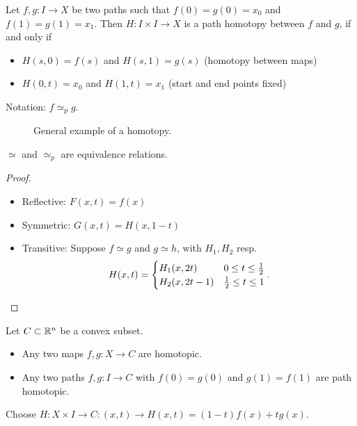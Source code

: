 \begin{definition}
    Let $f, g: I \to  X$ be two paths such that $f(0) = g(0) = x_0$ and $f(1) = g(1) = x_1$. Then $H: I \times  I \to  X$ is a path homotopy between $f$ and $g$, if and only if
    \begin{itemize}
        \item $H(s,0) = f(s)$ and  $H(s, 1) = g(s)$ (homotopy between maps)
        \item  $H(0, t) = x_0$ and $H(1, t) = x_1$ (start and end points fixed)
    \end{itemize}
    Notation: $f \simeq_p g$.
\end{definition}


\begin{figure}[ht]
    \centering
    \caption{General example of a homotopy.}
    \label{fig:homotopy-general-example}
\end{figure}


\begin{lemma}
    $\simeq$ and  $\simeq_p$ are equivalence relations.
\end{lemma}
\begin{proof}
    \leavevmode
    \begin{itemize}
        \item Reflective: $F(x, t) = f(x)$
        \item Symmetric: $G(x, t) = H(x, 1-t)$ 
        \item Transitive:  Suppose $f \simeq g$ and  $g \simeq h$, with  $H_1, H_2$ resp.
            \[
                H(x, t) = \begin{cases}
                    H_1(x, 2t) & 0 \le t \le  \frac{1}{2}\\
                    H_2(x, 2t-1) & \frac{1}{2} \le  t \le  1
                \end{cases}
            . \qedhere
        \] 
    \end{itemize}
\end{proof}


\begin{eg}
   Let $C \subset \mathbb{R}^n$ be a convex subset.
   \begin{itemize}
       \item Any two maps $f, g: X \to C$ are homotopic.
       \item Any two paths $f, g: I \to  C$ with $f(0) = g(0)$ and  $g(1) = f(1)$ are path homotopic.
   \end{itemize}

   Choose $H: X \times I \to  C: (x, t) \to  H(x, t) = (1-t) f(x) + t g(x)$.
\end{eg}


